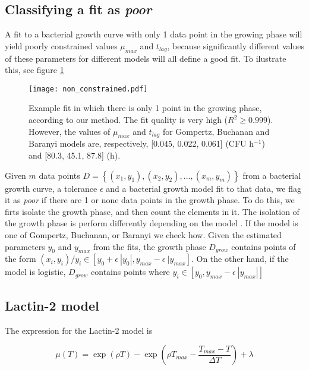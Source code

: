 \documentclass[titlepage,11pt]{article}
\begin{document}
\begin{linenumbers}
		\subsection{Classifying a fit as \textit{poor}}\label{subsec:poor}
		A fit to a bacterial growth curve with only 1 data point in the growing phase will yield poorly constrained values $ \mu_{max} $ and $t_{lag}$, because significantly different values of  these parameters for different models will all define a good fit. To ilustrate this, see figure \ref{fig:non_constrained}
		\begin{figure}[h]
			\texttt{[image: non\_constrained.pdf]}
			\centering
			\caption{Example fit in which there is only 1 point in the growing phase, according to our method. The fit quality is very high ($ R^2 \ge 0.999 $). However, the values of $ \mu_{max} $ and $ t_{lag} $ for Gompertz, Buchanan and Baranyi models are, respectively, [0.045, 0.022, 0.061] (CFU h$^{-1}$) and [80.3, 45.1, 87.8] (h).}
			\label{fig:non_constrained}
		\end{figure}
		
		Given $ m $ data points $ D =  \left\{(x_1, y_1), (x_2, y_2), ... , (x_m, y_m)\right\} $ from a bacterial growth curve, a tolerance $ \epsilon $ and a bacterial growth model fit to that data, we flag it as \textit{poor} if there are 1 or none data points in the growth phase. To do this, we firts isolate the growth phase, and then count the elements in it. The isolation of the growth phase is perform differently depending on the model . 
		If the model is one of Gompertz, Buchanan, or Baranyi we check how. Given the estimated parameters $ y_{0} $ and $ y_{max} $ from the fits, the growth phase $D_{grow} $ contains points of the form $ (x_i, y_i) / y_i \in [y_0 + \epsilon\ |y_0| , y_{max} - \epsilon \ |y_{max}]$. On the other hand, if the model is logistic, $ D_{grow} $ contains points where $ y_i \in [y_0, y_{max}-\epsilon \ |y_{max}|] $
		
		\subsection{Lactin-2 model}\label{subsec:Lactin-2}
		The expression for the Lactin-2 model is 
		\begin{linenomath*}
			\begin{equation}\label{eq:Lactin-2}
			\mu(T) = \exp(\rho T) - \exp\left(\rho T_{max} - \frac{T_{max}-T}{\Delta T}\right) + \lambda	
			\end{equation}
		\end{linenomath*}
		

\end{linenumbers}
\end{document}
